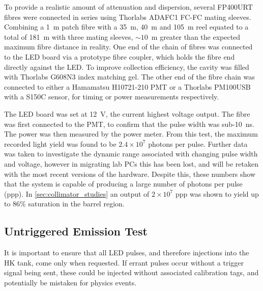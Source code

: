 \documentclass[a4paper,11pt]{article}
\let\oldsim\sim
\renewcommand{\sim}{{\oldsim}}
\begin{document}
To provide a realistic amount of attenuation and dispersion, several FP400URT fibres were connected in series using Thorlabs ADAFC1 FC-FC mating sleeves. Combining a 1~m patch fibre with a 35~m, 40~m and 105~m reel equated to a total of 181~m with three mating sleeves, $\sim10$~m greater than the expected maximum fibre distance in reality. One end of the chain of fibres was connected to the LED board via a prototype fibre coupler, which holds the fibre end directly against the LED. To improve collection efficiency, the cavity was filled with Thorlabs G608N3 index matching gel. The other end of the fibre chain was connected to either a Hamamatsu H10721-210 PMT or a Thorlabs PM100USB with a S150C sensor, for timing or power measurements respectively.

The LED board was set at 12~V, the current highest voltage output. The fibre was first connected to the PMT, to confirm that the pulse width was sub-10~ns. The power was then measured by the power meter. From this test, the maximum recorded light yield was found to be $2.4\times10^7$ photons per pulse. Further data was taken to investigate the dynamic range associated with changing pulse width and voltage, however in migrating lab PCs this has been lost, and will be retaken with the most recent versions of the hardware. Despite this, these numbers show that the system is capable of producing a large number of photons per pulse (ppp). In \cref{sec:collimator_studies} an output of $2\times10^7$ ppp was shown to yield up to 86\% saturation in the barrel region.

\subsection{Untriggered Emission Test}\label{sec:untriggered}

It is important to ensure that all LED pulses, and therefore injections into the HK tank, come only when requested. If errant pulses occur without a trigger signal being sent, these could be injected without associated calibration tags, and potentially be mistaken for physics events.
\end{document}
